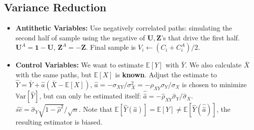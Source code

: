 \documentclass[9pt, landscape]{article}
\begin{document}
\begin{multicols*}{3}
\section{Variance Reduction}
\begin{itemize}
	\item \textbf{Antithetic Variables:} Use negatively correlated paths: simulating the second half of sample using the negative of $\bm{U}, \bm{Z}$'s that drive the first half. $\bm{U}^A=\bm{1}-\bm{U}$, $\bm{Z}^A=-\bm{Z}$. Final sample is $V_i \gets (C_i+C_i^A)/2$.
	\item \textbf{Control Variables:} We want to estimate $\mathbb{E}\left[Y\right]$ with $\bar{Y}$. We also calculate $\bar{X}$ with the same paths, but $\mathbb{E}\left[X\right]$ is \textbf{known}. Adjust the estimate to $\widehat{Y}=\bar{Y}+\widehat{a}(\bar{X}-\mathbb{E}\left[X\right])$, $\widehat{a}=-\sigma_{XY}/\sigma^2_{X}=-\rho_{XY}\sigma_Y/\sigma_{X}$ is chosen to minimize $\mathrm{\mathbb{V}ar}[\widehat{Y}]$, but can only be estimated itself: $\widehat{\widehat{a}}=-\widehat{\rho}_{XY}\widehat{\sigma}_Y/\widehat{\sigma}_{X}$. $\widehat{se}=\widehat{\sigma}_Y\sqrt{1-\hat{\rho}^2}/\sqrt{n}$. Note that $\mathbb{E}[\widehat{Y}(\widehat{a})]=\mathbb{E}\left[Y\right]\ne \mathbb{E}[\widehat{Y}(\widehat{\widehat{a}})]$, the resulting estimator is biased.
	\end{itemize}

\end{multicols*}
\end{document}
